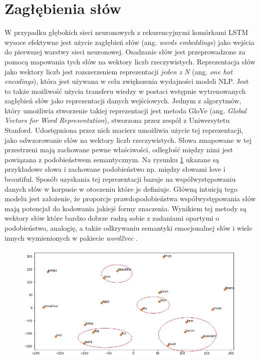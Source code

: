 \section{Zagłębienia słów}

W przypadku głębokich sieci neuronowych z rekurencyjnymi komórkami LSTM wysoce efektywne jest użycie zagłębień słów (ang. \textit{words embeddings}) jako wejścia do pierwszej warstwy sieci neuronowej. Osadzanie słów jest przeprowadzone za pomocą mapowania tych słów na wektory liczb rzeczywistych. Reprezentacja słów jako wektory liczb jest rozszerzeniem reprezentacji \textit{jeden z N} (ang. \textit{one hot encodings}), która jest używana w celu zwiększenia wydajności modeli NLP. Jest to także możliwość użycia transferu wiedzy w postaci wstępnie wytrenowanych zagłębień słów jako reprezentacji danych wejściowych. Jednym z algorytmów, który umożliwia stworzenie takiej reprezentacji jest metoda GloVe  \cite{brochier2019global} (ang. \textit{Global Vectors for Word Representation}), stworzona przez zespół z Uniwersytetu Stanford. Udostępniona przez nich macierz umożliwia użycie tej reprezentacji, jako odwzorowanie słów na wektory liczb rzeczywistych. Słowa zmapowane w tej przestrzeni mają zachowane pewne właściwości, odległość między nimi jest powiązana z podobieństwem semantycznym. Na rysunku \ref{rys:visualize_glove} ukazane są przykładowe słowa i zachowane podobieństwo np. między słowami love i beautiful. Sposób uzyskania tej reprezentacji bazuje na współwystępowaniu danych słów w korpusie w otoczeniu które je definiuje. Główną intuicją tego modelu jest założenie, że proporcje prawdopodobieństwa współwystępowania słów mają potencjał do kodowania jakiejś formy znaczenia. Wynikiem tej metody są wektory słów które bardzo dobrze radzą sobie z zadaniami opartymi o podobieństwo, analogię, a także odkrywaniu semantyki emocjonalnej słów i wiele innych wymienionych w pakiecie \textit{word2vec} \cite{mikolov2013efficient}.

\begin{figure}[t]
\centering\includegraphics[width=\textwidth]{figures/visualize_glove.png}
\label{rys:visualize_glove}
\end{figure}

